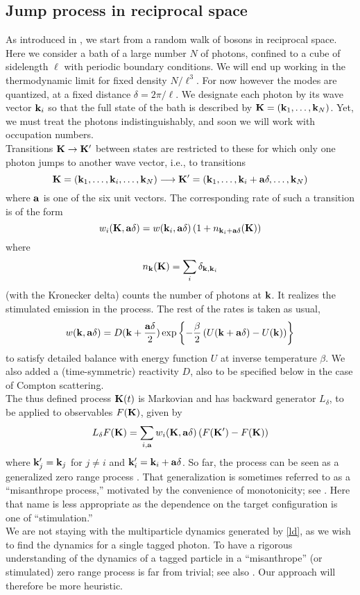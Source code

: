 \documentclass[a4paper,12pt,reqno,superscriptaddress,nofootinbib]{revtex4}
\theoremstyle{plain}
\theoremstyle{definition}
\theoremstyle{remark}
\newcommand{\0}{^{(0)}}
\newcommand{\1}{^{(1)}}
\newcommand{\2}{^{(2)}}
\begin{document}
\subsection{Jump process in reciprocal space}

As introduced in \cite{paper}, we start from a random walk of bosons in reciprocal space. Here we consider a bath of a large number $N$ of photons, confined to a cube of sidelength $\ell$ with 
periodic boundary conditions. We will end up working in the thermodynamic limit for fixed density $N/\ell^3$.  For now however the modes are quantized, at a fixed distance $\delta = 2\pi / \ell$.  We designate each photon by its wave vector $\vb{k}_i$ so that the full state of the bath is described by $\vb{K} = (\vb{k}_1, \dots, \vb{k}_N)$.  Yet, we must treat the photons indistinguishably, and soon we will work with occupation numbers.\\
Transitions $\vb{K}\rightarrow \vb{K}'$ between  states are restricted to 
these for which only one photon jumps to another wave vector, i.e., to transitions
\[
\vb{K} = (\vb{k}_1, 
\dots,\vb{k}_i,\ldots, \vb{k}_N)\longrightarrow \vb{K}' = (\vb{k}_1, 
\dots, \vb{k}_i+\vb{a} \delta,\dots, \vb{k}_N)
\] 
where $\vb{a}$ is one of the six unit vectors. The corresponding rate of such a transition is of the form
\[
w_i(\vb{K}, \vb{a}\delta) = w(\vb{k}_i,\vb{a}\delta) \left(1 + n_{\vb{k}_i+\vb{a} \delta}(\vb{K} )\right)
\]
where
\[
n_{\vb{k}}(\vb{K}) = \sum_{i} \delta_{ \vb{k}, \vb{k}_i}
\]
(with the Kronecker delta) counts the number of photons at $\vb{k}$.  It realizes the stimulated emission in the process.  The rest of the rates is taken as usual,
\[
w(\vb{k},\vb{a}\delta) = D( \vb{k} + \frac{\vb{a} \delta}{2} ) 
\exp\left\{-\frac{\beta}{2}\left(U(\vb{k} + \vb{a} \delta) - 
U(\vb{k})\right)\right\}
\]
to satisfy detailed balance with energy function $U$ at inverse temperature $\beta$.   We also added a (time-symmetric) reactivity $D$, also to be specified below in the case of Compton scattering.\\

The thus defined process $\vb{K}(t)$ is Markovian and has backward generator $L_\delta$, to be applied to observables
$F(\vb{K})$, given by
\begin{equation}\label{ld}
L_\delta F(\vb{K})= \sum_{i,\vb{a}} w_i(\vb{K},\vb{a}\delta) \left(F(\vb{K}') 
-F(\vb{K})\right)
\end{equation}
where $\vb{k}'_j = \vb{k}_j$ for $j \neq i$ and 
$\vb{k}'_i = \vb{k}_i + \vb{a} \delta$.
So far, the process can be seen as a generalized zero range process \cite{blythe}.  That generalization is sometimes referred to as a ``misanthrope process,'' motivated by the convenience of monotonicity; see \cite{cocozza,sethuraman}.  Here that name is less appropriate as the dependence on the target configuration is one of ``stimulation.'' \\
We are not staying with the multiparticle dynamics generated by \eqref{ld}, as we wish to find the dynamics for a single tagged photon.  To have a rigorous understanding of the dynamics of a tagged particle in a ``misanthrope'' (or stimulated) zero range process is far from trivial; see also \cite{jara}.  Our approach will therefore be more heuristic.\\
\end{document}
